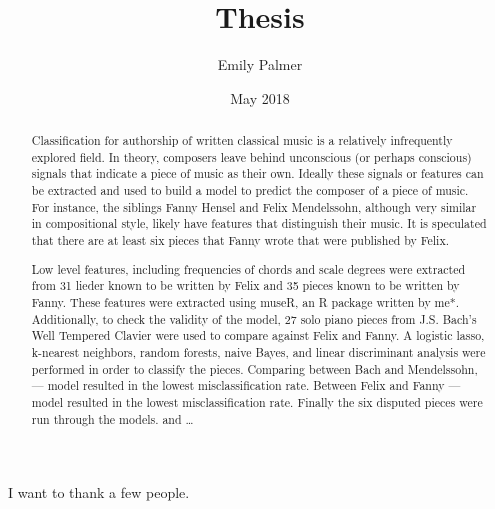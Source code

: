 \documentclass[12pt,twoside]{reedthesis}
\title{Thesis}
\author{Emily Palmer}
\date{May 2018}
\theoremstyle{definition}
\theoremstyle{definition}
\theoremstyle{definition}
\theoremstyle{remark}
\begin{document}
  \maketitle

\frontmatter %
\pagestyle{empty} %
  \begin{acknowledgements}
    I want to thank a few people.
  \end{acknowledgements}

  \hypersetup{linkcolor=black}
  \setcounter{tocdepth}{2}
  \tableofcontents

  \listoftables

  \listoffigures
  \begin{abstract}
    Classification for authorship of written classical music is a relatively
    infrequently explored field. In theory, composers leave behind
    unconscious (or perhaps conscious) signals that indicate a piece of
    music as their own. Ideally these signals or features can be extracted
    and used to build a model to predict the composer of a piece of music.
    For instance, the siblings Fanny Hensel and Felix Mendelssohn, although
    very similar in compositional style, likely have features that
    distinguish their music. It is speculated that there are at least six
    pieces that Fanny wrote that were published by Felix.
    
    Low level features, including frequencies of chords and scale degrees
    were extracted from 31 lieder known to be written by Felix and 35 pieces
    known to be written by Fanny. These features were extracted using museR,
    an R package written by me*. Additionally, to check the validity of the
    model, 27 solo piano pieces from J.S. Bach's Well Tempered Clavier were
    used to compare against Felix and Fanny. A logistic lasso, k-nearest
    neighbors, random forests, naive Bayes, and linear discriminant analysis
    were performed in order to classify the pieces. Comparing between Bach
    and Mendelssohn, --- model resulted in the lowest misclassification
    rate. Between Felix and Fanny --- model resulted in the lowest
    misclassification rate. Finally the six disputed pieces were run through
    the models. and \ldots{}
  \end{abstract}

\mainmatter %
\pagestyle{fancyplain} %
\end{document}
